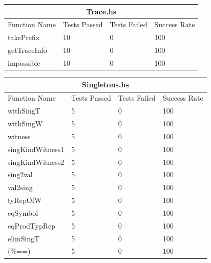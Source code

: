 \documentclass[12pt, svgnames]{article}
\begin{document}
\begin{adjustwidth}{-0.5cm}{}    
    \begin{tabular}[h!]{ |p{5cm}||p{3cm}|p{3cm}|p{3cm}|  }
        
        \hline
        \multicolumn{4}{|c|}{Trace.hs} \\
        \hline
        Function Name & Tests Passed & Tests Failed & Success Rate\\
        \hline
        takePrefix   & 10    &0&   100\\
        getTraceInfo&   10  & 0   &100\\
        impossible & 10 & 0&  100\\
        \hline
    \end{tabular}
\end{adjustwidth}

\begin{adjustwidth}{-0.5cm}{}    
    \begin{tabular}[h!]{ |p{5cm}||p{3cm}|p{3cm}|p{3cm}|  }      
        \hline
        \multicolumn{4}{|c|}{Singletons.hs} \\
        \hline
        Function Name & Tests Passed & Tests Failed & Success Rate\\
        \hline
        withSingT   & 5    &0&   100\\
        withSingW&   5  & 0   &100\\
        witness &5 & 0&  100\\
        singKindWitness1 &5 & 0&  100\\
        singKindWitness2 &   5  & 0&100\\
        sing2val & 5  & 0   &100\\
        val2sing& 5  & 0&100\\
        tyRepOfW& 5  & 0&100\\
        eqSymbol& 5  & 0&100\\
        eqProdTypRep& 5  & 0& 100\\
        elimSingT& 5  & 0&100\\
        (\%==) & 5  & 0&100\\
        \hline
    \end{tabular}
\end{adjustwidth}
\end{document}
